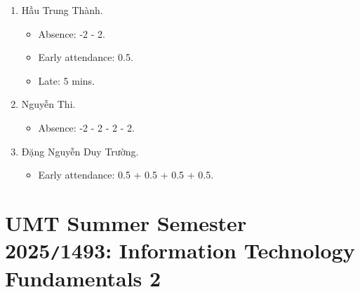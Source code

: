 \documentclass{article}
\begin{document}
\begin{enumerate}
	\item {\sc Hầu Trung Thành.}
	\begin{itemize}
		\item Absence: -2 - 2.
		\item Early attendance: 0.5.
		\item Late: 5 mins.
	\end{itemize}
	\item {\sc Nguyễn Thi.}
	\begin{itemize}
		\item Absence: -2 - 2 - 2 - 2.
	\end{itemize}
	\item {\sc Đặng Nguyễn Duy Trường.}
	\begin{itemize}
		\item Early attendance: 0.5 + 0.5 + 0.5 + 0.5.
	\end{itemize}
\end{enumerate}


\section{UMT Summer Semester 2025{\tt/}1493: Information Technology Fundamentals 2}
\end{document}
